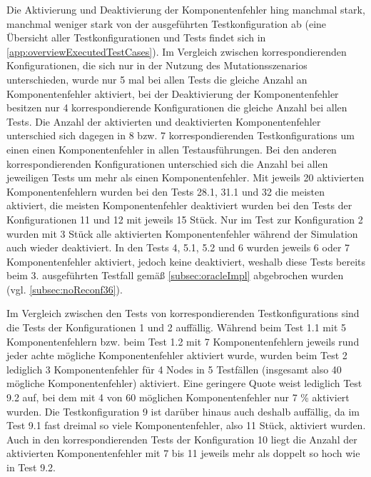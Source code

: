 Die Aktivierung und Deaktivierung der Komponentenfehler hing manchmal stark, manchmal weniger stark von der ausgeführten \gls{Testkonfiguration} ab (eine Übersicht aller Testkonfigurationen und Tests findet sich in \cref{app:overviewExecutedTestCases}).
Im Vergleich zwischen korrespondierenden Konfigurationen, die sich nur in der Nutzung des Mutationsszenarios unterschieden, wurde nur 5 mal bei allen \glspl{Test} die gleiche Anzahl an Komponentenfehler aktiviert, bei der Deaktivierung der Komponentenfehler besitzen nur 4 korrespondierende Konfigurationen die gleiche Anzahl bei allen Tests.
Die Anzahl der aktivierten und deaktivierten Komponentenfehler unterschied sich dagegen in 8 bzw. 7 korrespondierenden \glspl{Testkonfiguration} um einen einen Komponentenfehler in allen Testausführungen.
Bei den anderen korrespondierenden Konfigurationen unterschied sich die Anzahl bei allen jeweiligen \glspl{Test} um mehr als einen Komponentenfehler.
Mit jeweils 20 aktivierten Komponentenfehlern wurden bei den \glspl{Test} 28.1, 31.1 und 32 die meisten aktiviert, die meisten Komponentenfehler deaktiviert wurden bei den \glspl{Test} der Konfigurationen 11 und 12 mit jeweils 15 Stück.
Nur im \gls{Test} zur Konfiguration 2 wurden mit 3 Stück alle aktivierten Komponentenfehler während der Simulation auch wieder deaktiviert.
In den \glspl{Test} 4, 5.1, 5.2 und 6 wurden jeweils 6 oder 7 Komponentenfehler aktiviert, jedoch keine deaktiviert, weshalb diese \glspl{Test} bereits beim 3. ausgeführten \gls{Testfall} gemäß \cref{subsec:oracleImpl} abgebrochen wurden (vgl. \cref{subsec:noReconf36}).

Im Vergleich zwischen den \glspl{Test} von korrespondierenden \glspl{Testkonfiguration} sind die \glspl{Test} der Konfigurationen 1 und 2 auffällig.
Während beim \gls{Test} 1.1 mit 5 Komponentenfehlern bzw. beim \gls{Test} 1.2 mit 7 Komponentenfehlern jeweils rund jeder achte mögliche Komponentenfehler aktiviert wurde, wurden beim \gls{Test} 2 lediglich 3 Komponentenfehler für 4 Nodes in 5 Testfällen (insgesamt also 40 mögliche Komponentenfehler) aktiviert.
Eine geringere Quote weist lediglich \gls{Test} 9.2 auf, bei dem mit 4 von 60 möglichen Komponentenfehler nur 7 \% aktiviert wurden.
Die \gls{Testkonfiguration} 9 ist darüber hinaus auch deshalb auffällig, da im \gls{Test} 9.1 fast dreimal so viele Komponentenfehler, also 11 Stück, aktiviert wurden.
Auch in den korrespondierenden \glspl{Test} der Konfiguration 10 liegt die Anzahl der aktivierten Komponentenfehler mit 7 bis 11 jeweils mehr als doppelt so hoch wie in \gls{Test} 9.2.

